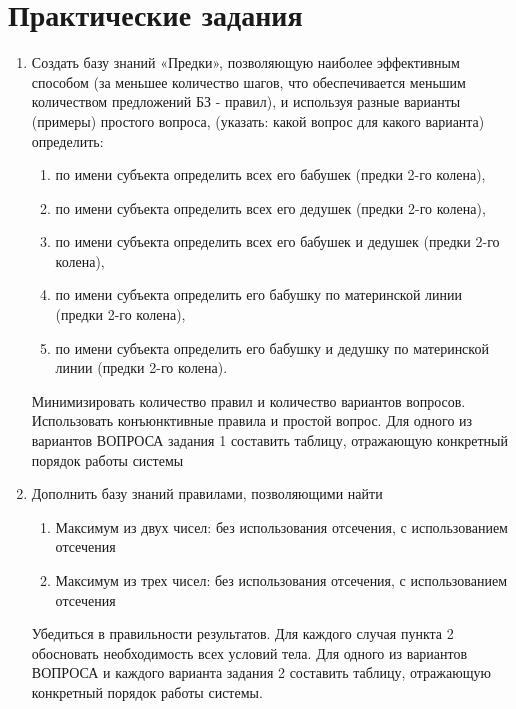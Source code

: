 \chapter{Практические задания}


\begin{enumerate}
	\item Создать базу знаний «Предки», позволяющую наиболее эффективным способом
	(за меньшее количество шагов, что обеспечивается меньшим количеством
	предложений БЗ - правил), и используя разные варианты (примеры) простого вопроса,
	(указать: какой вопрос для какого варианта) определить:
	\begin{enumerate}
		\item по имени субъекта определить всех его бабушек (предки 2-го колена),
		\item по имени субъекта определить всех его дедушек (предки 2-го колена),
		\item по имени субъекта определить всех его бабушек и дедушек (предки 2-го колена),
		\item по имени субъекта определить его бабушку по материнской линии (предки 2-го колена),
		\item по имени субъекта определить его бабушку и дедушку по материнской линии
		(предки 2-го колена).
	\end{enumerate}
	Минимизировать количество правил и количество вариантов вопросов. Использовать
конъюнктивные правила и простой вопрос. Для одного из вариантов ВОПРОСА задания 1
составить таблицу, отражающую конкретный порядок работы системы

	\item Дополнить базу знаний правилами, позволяющими найти
	\begin{enumerate}
		\item Максимум из двух чисел: без использования отсечения, с использованием отсечения
		\item Максимум из трех чисел: без использования отсечения, с использованием отсечения
	\end{enumerate}

	Убедиться в правильности результатов.
	Для каждого случая пункта 2 обосновать необходимость всех условий тела.
	Для одного из вариантов ВОПРОСА и каждого варианта задания 2 составить
	таблицу, отражающую конкретный порядок работы системы.

\end{enumerate}


